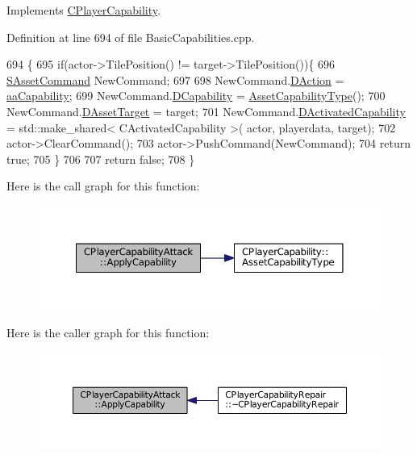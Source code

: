 Implements \hyperlink{classCPlayerCapability_a2ca6fd7fbd9c0178f1cf1d049c63825f}{C\+Player\+Capability}.



Definition at line 694 of file Basic\+Capabilities.\+cpp.


\begin{DoxyCode}
694                                                                                                            
                                                          \{
695     \textcolor{keywordflow}{if}(actor->TilePosition() != target->TilePosition())\{
696         \hyperlink{structSAssetCommand}{SAssetCommand} NewCommand;
697         
698         NewCommand.\hyperlink{structSAssetCommand_a8edd3b3d59a76d5514ba403bc8076a75}{DAction} = \hyperlink{GameDataTypes_8h_ab47668e651a3032cfb9c40ea2d60d670acf9fb164e8abd71c71f4a8c7fda360d4}{aaCapability};
699         NewCommand.\hyperlink{structSAssetCommand_a734ea7c6847457b437360f333f570ff9}{DCapability} = \hyperlink{classCPlayerCapability_a433bb196cd6ab6a932f1cac102b3aa98}{AssetCapabilityType}();
700         NewCommand.\hyperlink{structSAssetCommand_a3d9b43f6e59c386c48c41a65448a0c39}{DAssetTarget} = target;
701         NewCommand.\hyperlink{structSAssetCommand_ad8beda19520811cc70fe1eab16c774dd}{DActivatedCapability} = std::make\_shared< CActivatedCapability >(
      actor, playerdata, target);
702         actor->ClearCommand();
703         actor->PushCommand(NewCommand);
704         \textcolor{keywordflow}{return} \textcolor{keyword}{true};
705     \}
706 
707     \textcolor{keywordflow}{return} \textcolor{keyword}{false};
708 \}
\end{DoxyCode}
Here is the call graph for this function\+:
\nopagebreak
\begin{figure}[H]
\begin{center}
\leavevmode
\includegraphics[width=350pt]{classCPlayerCapabilityAttack_a536095f572f9f6af786eaec0376f3771_cgraph}
\end{center}
\end{figure}
Here is the caller graph for this function\+:
\nopagebreak
\begin{figure}[H]
\begin{center}
\leavevmode
\includegraphics[width=350pt]{classCPlayerCapabilityAttack_a536095f572f9f6af786eaec0376f3771_icgraph}
\end{center}
\end{figure}
